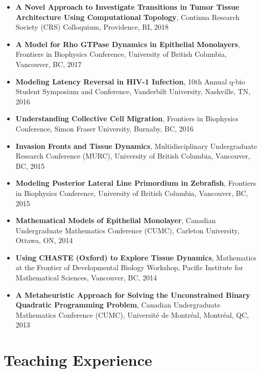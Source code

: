 \documentclass[margin,line]{res}
\begin{document}
\begin{resume}
{\begin{itemize}
\item {\bf A Novel Approach to Investigate Transitions in Tumor Tissue Architecture Using Computational Topology}, Continua Research Society (CRS) Colloquium, Providence, RI, 2018

\item {\bf A Model for Rho GTPase Dynamics in Epithelial Monolayers}, Frontiers in Biophysics Conference, University of British Columbia, Vancouver, BC, 2017

\item {\bf Modeling Latency Reversal in HIV-1 Infection}, 10th Annual q-bio Student Symposium and Conference, Vanderbilt University, Nashville, TN, 2016

\item {\bf Understanding Collective Cell Migration}, Frontiers in Biophysics Conference, Simon Fraser University, Burnaby, BC, 2016

\item {\bf Invasion Fronts and Tissue Dynamics}, Multidisciplinary Undergraduate Research Conference (MURC), University of British Columbia, Vancouver, BC, 2015

\item {\bf Modeling Posterior Lateral Line Primordium in Zebrafish}, Frontiers in Biophysics Conference, University of British Columbia, Vancouver, BC, 2015

\item {\bf Mathematical Models of Epithelial Monolayer}, Canadian Undergraduate Mathematics Conference (CUMC), Carleton University, Ottawa, ON, 2014

\item {\bf Using CHASTE (Oxford) to Explore Tissue Dynamics}, Mathematics at the Frontier of Developmental Biology Workshop, Pacific Institute for Mathematical Sciences, Vancouver, BC, 2014

\item {\bf A Metaheuristic Approach for Solving the Unconstrained Binary Quadratic Programming Problem}, Canadian Undergraduate Mathematics Conference (CUMC), Universit\'e de Montr\'eal, Montr\'eal, QC, 2013
\end{itemize}
}

\vspace*{.3cm}

\section{\sc Teaching Experience}


\end{resume}
\end{document}

